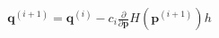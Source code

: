 \documentclass[preview]{standalone}
\begin{document}
\begin{align*}
\mathbf q^{(i+1)}=\mathbf q^{(i)}-c_i\frac{\partial}{\partial\mathbf p}H(\mathbf p^{(i+1)})h
\end{align*}
\end{document}
